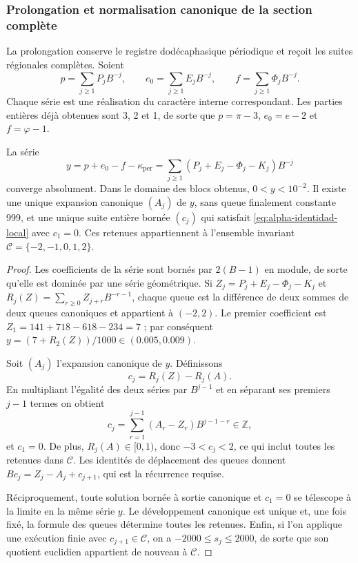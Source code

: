

\subsubsection{Prolongation et normalisation canonique de la section complète}
\label{subsec:alpha-completa}

La prolongation conserve le registre dodécaphasique périodique et reçoit les suites
régionales complètes. Soient
\[
 p=\sum_{j\geq1}P_jB^{-j},\qquad
 e_0=\sum_{j\geq1}E_jB^{-j},\qquad
 f=\sum_{j\geq1}\Phi_jB^{-j}.
\]
Chaque série est une réalisation du caractère interne correspondant.  
Les parties entières déjà obtenues sont 3, 2 et 1, de sorte que  
\(p=\pi-3\), \(e_0=e-2\) et  
\(f=\varphi-1\).

\begin{proposition}
\label{prop:alpha-normalizacion}
La série
\begin{equation}
 y=p+e_0-f-\kappa_{\mathrm{per}}
   =\sum_{j\geq1}(P_j+E_j-\Phi_j-K_j)B^{-j}
 \label{eq:alpha-serie}
\end{equation}
converge absolument. Dans le domaine des blocs obtenus,
\(0<y<10^{-2}\). Il existe une unique expansion canonique \((A_j)\) de
\(y\), sans queue finalement constante 999, et une unique suite entière
bornée \((c_j)\) qui satisfait \eqref{eq:alpha-identidad-local} avec
\(c_1=0\). Ces retenues appartiennent à l'ensemble invariant
\(\mathcal C=\{-2,-1,0,1,2\}\).
\end{proposition}

\begin{proof}
Les coefficients de la série sont bornés par \(2(B-1)\) en module,  
de sorte qu'elle est dominée par une série géométrique. Si  
\(Z_j=P_j+E_j-\Phi_j-K_j\) et  
\(R_j(Z)=\sum_{r\geq0}Z_{j+r}B^{-r-1}\), chaque queue est la différence  
de deux sommes de deux queues canoniques et appartient à \((-2,2)\).  
Le premier coefficient est  
\(Z_1=141+718-618-234=7\) ; par conséquent  
\(y=(7+R_2(Z))/1000\in(0.005,0.009)\).

Soit \((A_j)\) l'expansion canonique de \(y\). Définissons
\[
 c_j=R_j(Z)-R_j(A).
\]
En multipliant l'égalité des deux séries par \(B^{j-1}\) et en séparant
ses premiers \(j-1\) termes on obtient
\[
 c_j=\sum_{r=1}^{j-1}(A_r-Z_r)B^{j-1-r}\in\mathbb Z,
\]
et \(c_1=0\). De plus, \(R_j(A)\in[0,1)\), donc
\(-3<c_j<2\), ce qui inclut toutes les retenues dans \(\mathcal C\).
Les identités de déplacement des queues donnent
\(Bc_j=Z_j-A_j+c_{j+1}\), qui est la récurrence requise.

Réciproquement, toute solution bornée à sortie canonique et
\(c_1=0\) se télescope à la limite en la même série \(y\). Le développement
canonique est unique et, une fois fixé, la formule des queues détermine
toutes les retenues. Enfin, si l'on applique une exécution finie avec
\(c_{j+1}\in\mathcal C\), on a \(-2000\leq s_j\leq2000\),
de sorte que son quotient euclidien appartient de nouveau à \(\mathcal C\).
\end{proof}

